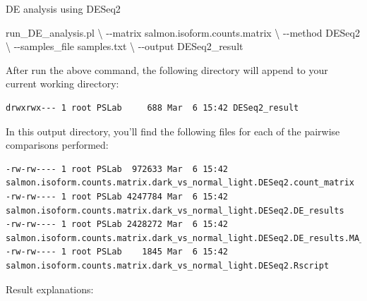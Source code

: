 \documentclass[
  letterpaper,
  DIV=11,
  numbers=noendperiod]{scrreprt}
\newenvironment{Shaded}{\begin{snugshade}}{\end{snugshade}}
\newcommand{\DataTypeTok}[1]{\textcolor[rgb]{0.68,0.00,0.00}{#1}}
\newcommand{\ExtensionTok}[1]{\textcolor[rgb]{0.00,0.23,0.31}{#1}}
\newcommand{\NormalTok}[1]{\textcolor[rgb]{0.00,0.23,0.31}{#1}}
\begin{document}
\begin{tcolorbox}[enhanced jigsaw, breakable, bottomrule=.15mm, left=2mm, coltitle=black, opacityback=0, colframe=quarto-callout-note-color-frame, toprule=.15mm, opacitybacktitle=0.6, colbacktitle=quarto-callout-note-color!10!white, bottomtitle=1mm, colback=white, toptitle=1mm, titlerule=0mm, rightrule=.15mm, arc=.35mm, title=\textcolor{quarto-callout-note-color}{\faInfo}\hspace{0.5em}{Activity}, leftrule=.75mm]

DE analysis using DESeq2

\begin{Shaded}
\begin{Highlighting}[]
\ExtensionTok{run\_DE\_analysis.pl} \DataTypeTok{\textbackslash{}}
\NormalTok{{-}{-}matrix salmon.isoform.counts.matrix }\DataTypeTok{\textbackslash{}}
\NormalTok{{-}{-}method DESeq2 }\DataTypeTok{\textbackslash{}}
\NormalTok{{-}{-}samples\_file samples.txt }\DataTypeTok{\textbackslash{}}
\NormalTok{{-}{-}output DESeq2\_result}
\end{Highlighting}
\end{Shaded}

\end{tcolorbox}

After run the above command, the following directory will append to your
current working directory:

\begin{verbatim}
drwxrwx--- 1 root PSLab     688 Mar  6 15:42 DESeq2_result
\end{verbatim}

In this output directory, you'll find the following files for each of
the pairwise comparisons performed:

\begin{verbatim}
-rw-rw---- 1 root PSLab  972633 Mar  6 15:42 salmon.isoform.counts.matrix.dark_vs_normal_light.DESeq2.count_matrix
-rw-rw---- 1 root PSLab 4247784 Mar  6 15:42 salmon.isoform.counts.matrix.dark_vs_normal_light.DESeq2.DE_results
-rw-rw---- 1 root PSLab 2428272 Mar  6 15:42 salmon.isoform.counts.matrix.dark_vs_normal_light.DESeq2.DE_results.MA_n_Volcano.pdf
-rw-rw---- 1 root PSLab    1845 Mar  6 15:42 salmon.isoform.counts.matrix.dark_vs_normal_light.DESeq2.Rscript
\end{verbatim}

Result explanations:
\end{document}
